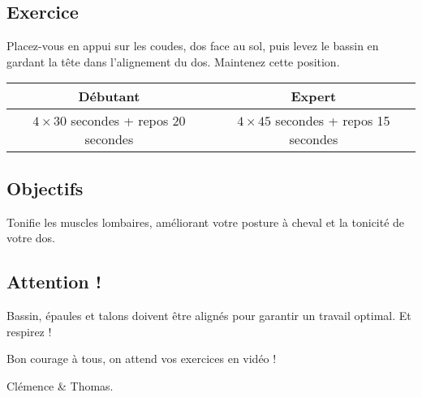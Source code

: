 \documentclass[12pt,a4paper]{article}
\subtitle{Fiche \no 5 -- Gainage retourné}
\begin{document}
\maketitle




\subsection*{Exercice}
	Placez-vous en appui sur les coudes, dos face au sol, puis levez le bassin en gardant la tête dans l'alignement du dos. Maintenez cette position.

	\begin{center}
		\begin{tabular}{c|c}
			\textbf{Débutant} & \textbf{Expert} \\
			\hline
			$4\times 30$ secondes + repos 20 secondes & $4\times45$ secondes + repos 15 secondes \\
		\end{tabular}
	\end{center}

\subsection*{Objectifs}
	Tonifie les muscles lombaires, améliorant votre posture à cheval et la tonicité de votre dos.

\subsection*{Attention !}
	Bassin, épaules et talons doivent être alignés pour garantir un travail optimal. Et respirez !

\vfill
\begin{flushright}
	Bon courage à tous, on attend vos exercices en vidéo ! \phantom{Clémence et Thomas}

	Clémence \& Thomas.
\end{flushright}
\end{document}
